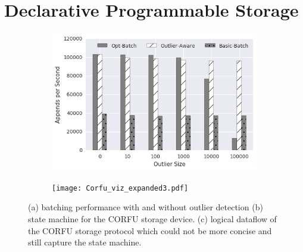 \section{Declarative Programmable Storage}
\label{sec:prog-model}

\begin{figure}[t]
\begin{subfigure}{.8\columnwidth}
    \centering
    \includegraphics[width=0.95\columnwidth]{batching-outlier-detect.png}
    \caption{}
    \label{fig:batching-outlier}
\end{subfigure}\hfill
\begin{subfigure}{.3\columnwidth}
\centering
{}
\caption{}
\label{fig:corfu-sm}
\end{subfigure}\hfill
\begin{subfigure}{.65\columnwidth}
\centering
\texttt{[image: Corfu\_viz\_expanded3.pdf]}
\caption{}
\label{fig:dataflow}
\end{subfigure}
\caption{(a) batching performance with and without outlier detection (b) state
machine for the CORFU storage device. (c) logical dataflow of the
CORFU storage protocol which could not be more concise and still capture the
state machine.}
\label{fig:pm}
\end{figure}

